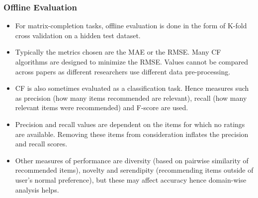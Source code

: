 \documentclass{article}
\begin{document}
\subsubsection{Offline Evaluation}
\begin{itemize}
    \item For matrix-completion tasks, offline evaluation is done in the form of K-fold cross validation on a hidden test dataset. 
    
    \item Typically the metrics chosen are the MAE or the RMSE. Many CF algorithms are designed to minimize the RMSE. Values cannot be compared across papers as different researchers use different data pre-processing.
    
    \item CF is also sometimes evaluated as a classification task. Hence measures such as precision (how many items recommended are relevant), recall (how many relevant items were recommended) and F-score are used.
    
    \item Precision and recall values are dependent on the items for which no ratings are available. Removing these items from consideration inflates the precision and recall scores. 
    
    \item Other measures of performance are diversity (based on pairwise similarity of recommended items), novelty and serendipity (recommending items outside of user's normal preference), but these may affect accuracy hence domain-wise analysis helps. 
\end{itemize}
\end{document}
